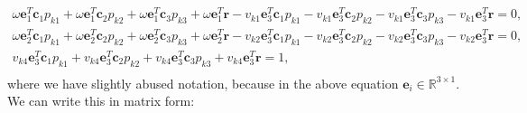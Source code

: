 \documentclass{article}
\begin{document}
{\small
\begin{align}
    \omega \mathbf{e}_1^T \mathbf{c}_1 p_{k1}
    + \omega \mathbf{e}_1^T \mathbf{c}_2 p_{k2}
    + \omega \mathbf{e}_1^T \mathbf{c}_3 p_{k3}
    + \omega \mathbf{e}_1^T \mathbf{r}
    - v_{k1}\mathbf{e}_3^T  \mathbf{c}_1 p_{k1}
    - v_{k1}\mathbf{e}_3^T \mathbf{c}_2 p_{k2}
    - v_{k1}\mathbf{e}_3^T \mathbf{c}_3 p_{k3}
    - v_{k1}\mathbf{e}_3^T \mathbf{r} = 0, \\
    \omega \mathbf{e}_2^T \mathbf{c}_1 p_{k1}
    + \omega \mathbf{e}_2^T \mathbf{c}_2 p_{k2}
    + \omega \mathbf{e}_2^T \mathbf{c}_3 p_{k3}
    + \omega \mathbf{e}_2^T \mathbf{r}
    - v_{k2}\mathbf{e}_3^T  \mathbf{c}_1 p_{k1}
    - v_{k2}\mathbf{e}_3^T \mathbf{c}_2 p_{k2}
    - v_{k2}\mathbf{e}_3^T \mathbf{c}_3 p_{k3}
    - v_{k2}\mathbf{e}_3^T \mathbf{r} = 0, \\
    v_{k4}\mathbf{e}_3^T  \mathbf{c}_1 p_{k1}
    + v_{k4}\mathbf{e}_3^T \mathbf{c}_2 p_{k2}
    + v_{k4}\mathbf{e}_3^T \mathbf{c}_3 p_{k3}
    + v_{k4}\mathbf{e}_3^T \mathbf{r} = 1, \\
\end{align}
}
where we have slightly abused notation, because in the above equation $\mathbf{e}_i \in \mathbb{R}^{3 \times 1}$.
We can write this in matrix form:
\end{document}
